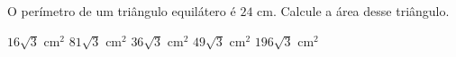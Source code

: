 \noindent\parbox{\linewidth}{

O perímetro de um triângulo equilátero é $24$ cm. Calcule a área desse triângulo.

$16\sqrt{3}$ cm$^2$
$81\sqrt{3}$ cm$^2$
$36\sqrt{3}$ cm$^2$
$49\sqrt{3}$ cm$^2$
$196\sqrt{3}$ cm$^2$



}


